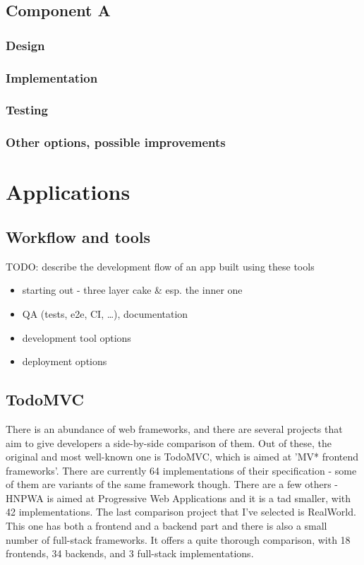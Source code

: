 \documentclass[english,odsaz]{fitthesis}
\begin{document}
\section{Component A}
\label{sec:org364862c}
\subsection{Design}
\label{sec:org3ea3bd8}
\subsection{Implementation}
\label{sec:org1c39a8d}
\subsection{Testing}
\label{sec:org47b61e4}
\subsection{Other options, possible improvements}
\label{sec:orge9c7cc5}

\chapter{Applications}
\label{sec:org48cade4}
\section{Workflow and tools}
\label{sec:orga5806a5}
TODO: describe the development flow of an app built using these tools

\begin{itemize}
\item starting out - three layer cake \& esp. the inner one
\item QA (tests, e2e, CI, \ldots{}), documentation
\item development tool options
\item deployment options
\end{itemize}

\section{TodoMVC}
\label{sec:org05be1fe}
There is an abundance of web frameworks, and there are several projects that aim
to give developers a side-by-side comparison of them. Out of these, the original
and most well-known one is TodoMVC, which is aimed at 'MV* frontend
frameworks'. There are currently 64 implementations of their specification -
some of them are variants of the same framework though. There are a few others -
HNPWA is aimed at Progressive Web Applications and it is a tad smaller, with 42
implementations. The last comparison project that I've selected is
RealWorld. This one has both a frontend and a backend part and there is also a
small number of full-stack frameworks. It offers a quite thorough comparison,
with 18 frontends, 34 backends, and 3 full-stack implementations.
\end{document}
